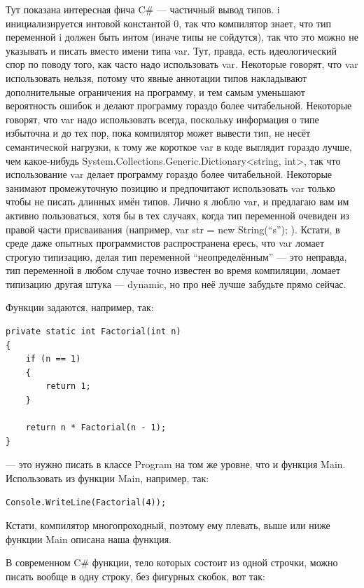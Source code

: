 \documentclass[a5paper]{article}
\begin{document}
Тут показана интересная фича C\# --- частичный вывод типов. i инициализируется интовой константой 0, так что компилятор знает, что тип переменной i должен быть интом (иначе типы не сойдутся), так что это можно не указывать и писать вместо имени типа var. Тут, правда, есть идеологический спор по поводу того, как часто надо использовать var. Некоторые говорят, что var использовать нельзя, потому что явные аннотации типов накладывают дополнительные ограничения на программу, и тем самым уменьшают вероятность ошибок и делают программу гораздо более читабельной. Некоторые говорят, что var надо использовать всегда, поскольку информация о типе избыточна и до тех пор, пока компилятор может вывести тип, не несёт семантической нагрузки, к тому же короткое var в коде выглядит гораздо лучше, чем какое-нибудь System.Collections.Generic.Dictionary<string, int>, так что использование var делает программу гораздо более читабельной. Некоторые занимают промежуточную позицию и предпочитают использовать var только чтобы не писать длинных имён типов. Лично я люблю var, и предлагаю вам им активно пользоваться, хотя бы в тех случаях, когда тип переменной очевиден из правой части присваивания (например, var str = new String(``s''); ). Кстати, в среде даже опытных программистов распространена ересь, что var ломает строгую типизацию, делая тип переменной ``неопределённым'' --- это неправда, тип переменной в любом случае точно известен во время компиляции, ломает типизацию другая штука --- dynamic, но про неё лучше забудьте прямо сейчас.

Функции задаются, например, так:

\begin{verbatim}
private static int Factorial(int n)
{
    if (n == 1)
    {
        return 1;
    }

    return n * Factorial(n - 1);
}
\end{verbatim}

--- это нужно писать в классе Program на том же уровне, что и функция Main. Использовать из функции Main, например, так:

\begin{verbatim}
Console.WriteLine(Factorial(4));
\end{verbatim}

Кстати, компилятор многопроходный, поэтому ему плевать, выше или ниже функции Main описана наша функция.

В современном C\# функции, тело которых состоит из одной строчки, можно писать вообще в одну строку, без фигурных скобок, вот так:
\end{document}
